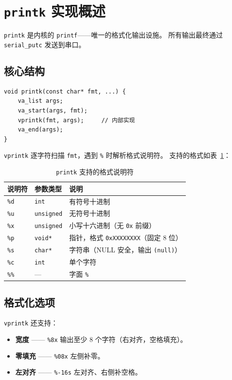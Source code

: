 \section{\texttt{printk} 实现概述}
\label{sec:printk}

\texttt{printk} 是内核的 \texttt{printf}——唯一的格式化输出设施。
所有输出最终通过 \texttt{serial\_putc} 发送到串口。

\subsection{核心结构}

\begin{lstlisting}[style=cstyle]
void printk(const char* fmt, ...) {
    va_list args;
    va_start(args, fmt);
    vprintk(fmt, args);     // 内部实现
    va_end(args);
}
\end{lstlisting}

\texttt{vprintk} 逐字符扫描 \texttt{fmt}，遇到 \texttt{\%} 时解析格式说明符。
支持的格式如表~\ref{tab:printk-formats}：

\begin{table}[H]
\centering
\begin{tabular}{llp{6cm}}
\toprule
\textbf{说明符} & \textbf{参数类型} & \textbf{说明} \\
\midrule
\texttt{\%d} & \texttt{int}      & 有符号十进制 \\
\texttt{\%u} & \texttt{unsigned} & 无符号十进制 \\
\texttt{\%x} & \texttt{unsigned} & 小写十六进制（无 \texttt{0x} 前缀） \\
\texttt{\%p} & \texttt{void*}    & 指针，格式 \texttt{0xXXXXXXXX}（固定 8 位） \\
\texttt{\%s} & \texttt{char*}    & 字符串（NULL 安全，输出 \texttt{(null)}） \\
\texttt{\%c} & \texttt{int}      & 单个字符 \\
\texttt{\%\%} & —               & 字面 \texttt{\%} \\
\bottomrule
\end{tabular}
\caption{\texttt{printk} 支持的格式说明符}
\label{tab:printk-formats}
\end{table}

\subsection{格式化选项}

\texttt{vprintk} 还支持：
\begin{itemize}
  \item \textbf{宽度} —— \texttt{\%8x} 输出至少 8 个字符（右对齐，空格填充）。
  \item \textbf{零填充} —— \texttt{\%08x} 左侧补零。
  \item \textbf{左对齐} —— \texttt{\%-16s} 左对齐、右侧补空格。
\end{itemize}

